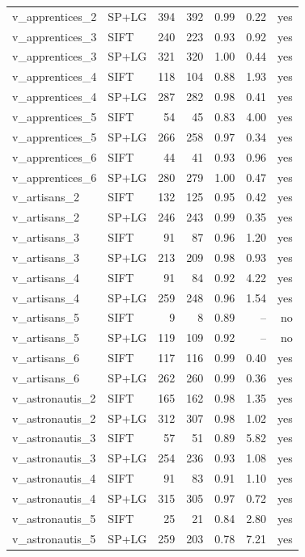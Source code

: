 \begin{longtable}{llrrrrr}
v\_apprentices\_2 & SP+LG & 394 & 392 & 0.99 & 0.22 & yes \\
v\_apprentices\_3 & SIFT & 240 & 223 & 0.93 & 0.92 & yes \\
v\_apprentices\_3 & SP+LG & 321 & 320 & 1.00 & 0.44 & yes \\
v\_apprentices\_4 & SIFT & 118 & 104 & 0.88 & 1.93 & yes \\
v\_apprentices\_4 & SP+LG & 287 & 282 & 0.98 & 0.41 & yes \\
v\_apprentices\_5 & SIFT & 54 & 45 & 0.83 & 4.00 & yes \\
v\_apprentices\_5 & SP+LG & 266 & 258 & 0.97 & 0.34 & yes \\
v\_apprentices\_6 & SIFT & 44 & 41 & 0.93 & 0.96 & yes \\
v\_apprentices\_6 & SP+LG & 280 & 279 & 1.00 & 0.47 & yes \\
v\_artisans\_2 & SIFT & 132 & 125 & 0.95 & 0.42 & yes \\
v\_artisans\_2 & SP+LG & 246 & 243 & 0.99 & 0.35 & yes \\
v\_artisans\_3 & SIFT & 91 & 87 & 0.96 & 1.20 & yes \\
v\_artisans\_3 & SP+LG & 213 & 209 & 0.98 & 0.93 & yes \\
v\_artisans\_4 & SIFT & 91 & 84 & 0.92 & 4.22 & yes \\
v\_artisans\_4 & SP+LG & 259 & 248 & 0.96 & 1.54 & yes \\
v\_artisans\_5 & SIFT & 9 & 8 & 0.89 & -- & no \\
v\_artisans\_5 & SP+LG & 119 & 109 & 0.92 & -- & no \\
v\_artisans\_6 & SIFT & 117 & 116 & 0.99 & 0.40 & yes \\
v\_artisans\_6 & SP+LG & 262 & 260 & 0.99 & 0.36 & yes \\
v\_astronautis\_2 & SIFT & 165 & 162 & 0.98 & 1.35 & yes \\
v\_astronautis\_2 & SP+LG & 312 & 307 & 0.98 & 1.02 & yes \\
v\_astronautis\_3 & SIFT & 57 & 51 & 0.89 & 5.82 & yes \\
v\_astronautis\_3 & SP+LG & 254 & 236 & 0.93 & 1.08 & yes \\
v\_astronautis\_4 & SIFT & 91 & 83 & 0.91 & 1.10 & yes \\
v\_astronautis\_4 & SP+LG & 315 & 305 & 0.97 & 0.72 & yes \\
v\_astronautis\_5 & SIFT & 25 & 21 & 0.84 & 2.80 & yes \\
v\_astronautis\_5 & SP+LG & 259 & 203 & 0.78 & 7.21 & yes \\

\end{longtable}
